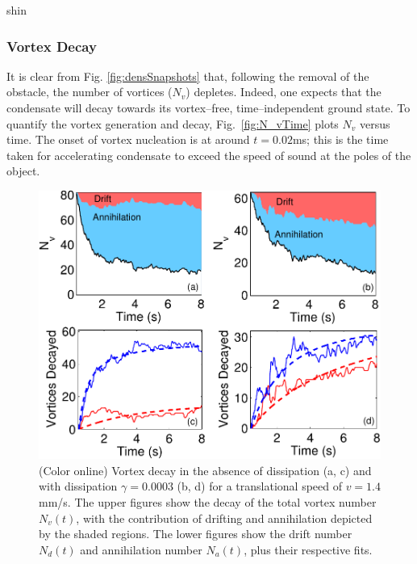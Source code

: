 \begin{chapter}{\label{cha:shin}shin}
\subsubsection{Vortex Decay}
It is clear from Fig. \ref{fig:densSnapshots} that, following the removal 
of the obstacle, the number of vortices ($N_v$) depletes.   
Indeed, one expects that the condensate will decay towards its 
vortex--free, time--independent ground state.  To quantify the vortex generation and
decay, Fig.~\ref{fig:N_vTime} plots $N_v$ versus time. 
The onset of vortex nucleation is at around $t=0.02$ms; 
this is the time taken for accelerating condensate to exceed the speed of 
sound at the poles of the object.
\begin{figure}
\includegraphics[width=1.0\linewidth]{shin/fig4}
\caption{\label{fig:N_vLong} (Color online) Vortex decay in the absence of dissipation (a, c) and with dissipation $\gamma=0.0003$ (b, d) for a translational speed of $v=1.4$mm/s.  The upper figures show the decay of the total vortex number $N_v(t)$, with the contribution of drifting and annihilation depicted by the shaded regions.  The lower figures show the drift number $N_d(t)$ and annihilation number $N_a(t)$, plus their respective fits.}
\end{figure}


\end{chapter}
